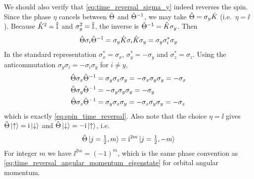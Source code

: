 We should also verify that \cref{eq:time_reversal_sigma_y} indeed reverses the spin. Since the phase $\eta$ cancels between $\hat{\Theta}$ and $\hat{\Theta}^{-1}$, we may take $\hat{\Theta} = \sigma_y \hat{K}$ (i.e.\ $\eta = \ii$). Because $\hat{K}^2 = \hat{\mathbb{I}}$ and $\sigma_y^2 = \hat{\mathbb{I}}$, the inverse is $\hat{\Theta}^{-1} = \hat{K} \sigma_y$. Then
\begin{align*}
    \hat{\Theta} \sigma_i \hat{\Theta}^{-1} = \sigma_y \hat{K} \sigma_i \hat{K} \sigma_y = \sigma_y \sigma_i^* \sigma_y
\end{align*}
In the standard representation $\sigma_x^* = \sigma_x$, $\sigma_y^* = - \sigma_y$ and $\sigma_z^* = \sigma_z$. Using the anticommutation $\sigma_y \sigma_i = - \sigma_i \sigma_y$ for $i \neq y$,
\begin{align*}
    \hat{\Theta} \sigma_x \hat{\Theta}^{-1} &= \sigma_y \sigma_x \sigma_y = - \sigma_x \sigma_y \sigma_y = - \sigma_x \\
    \hat{\Theta} \sigma_y \hat{\Theta}^{-1} &= - \sigma_y \sigma_y \sigma_y = - \sigma_y \\
    \hat{\Theta} \sigma_z \hat{\Theta}^{-1} &= \sigma_y \sigma_z \sigma_y = - \sigma_z \sigma_y \sigma_y = - \sigma_z
\end{align*}
which is exactly \cref{eq:spin_time_reversal}. Also note that the choice $\eta = \ii$ gives $\hat{\Theta} \ket{\uparrow} = \mathrm{i} \ket{\downarrow}$ and $\hat{\Theta} \ket{\downarrow} = - \mathrm{i} \ket{\uparrow}$, i.e.
\begin{align*}
    \hat{\Theta} \ket{j = \tfrac12, m} = \mathrm{i}^{2m} \ket{j = \tfrac12, -m}
\end{align*}
For integer $m$ we have $\ii^{2m} = (-1)^m$, which is the same phase convention as \cref{eq:time_reversal_angular_momentum_eigenstate} for orbital angular momentum.

